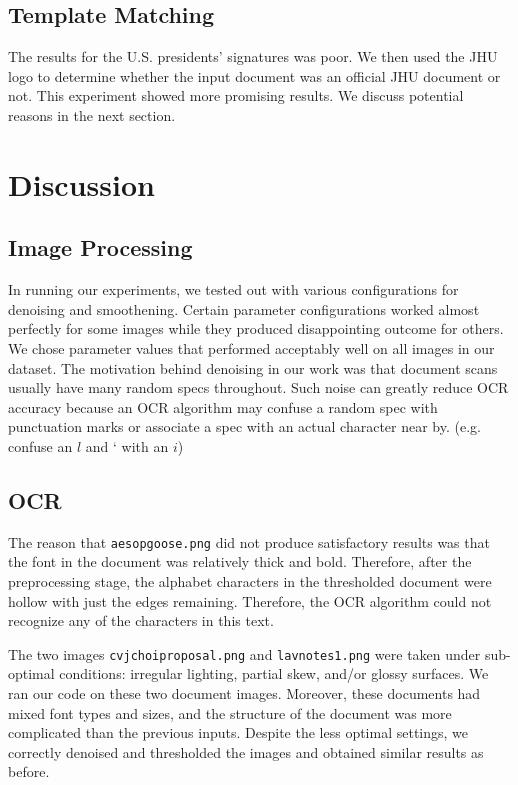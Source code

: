 \documentclass[11pt,letterpaper]{article}
\begin{document}
\subsection{Template Matching}

The results for the U.S. presidents' signatures was poor. We then used the JHU logo to determine whether the input document was an official JHU document or not. This experiment showed more promising results. We discuss potential reasons in the next section.

\section{Discussion}

\subsection{Image Processing}

In running our experiments, we tested out with various configurations for denoising and smoothening. Certain parameter configurations worked almost perfectly for some images while they produced disappointing outcome for others. We chose parameter values that performed acceptably well on all images in our dataset. The motivation behind denoising in our work was that document scans usually have many random specs throughout. Such noise can greatly reduce OCR accuracy because an OCR algorithm may confuse a random spec with punctuation marks or associate a spec with an actual character near by. (e.g. confuse an $l$ and ` with an $i$)

\subsection{OCR}

The reason that {\tt aesop\textunderscore goose.png} did not produce satisfactory results was that the font in the document was relatively thick and bold. Therefore, after the preprocessing stage, the alphabet characters in the thresholded document were hollow with just the edges remaining. Therefore, the OCR algorithm could not recognize any of the characters in this text.

The two images {\tt cv\textunderscore jchoi\textunderscore proposal.png} and {\tt lav\textunderscore notes1.png} were taken under sub-optimal conditions: irregular lighting, partial skew, and/or glossy surfaces. We ran our code on these two document images. Moreover, these documents had mixed font types and sizes, and the structure of the document was more complicated than the previous inputs. Despite the less optimal settings, we correctly denoised and thresholded the images and obtained similar results as before.
\end{document}
